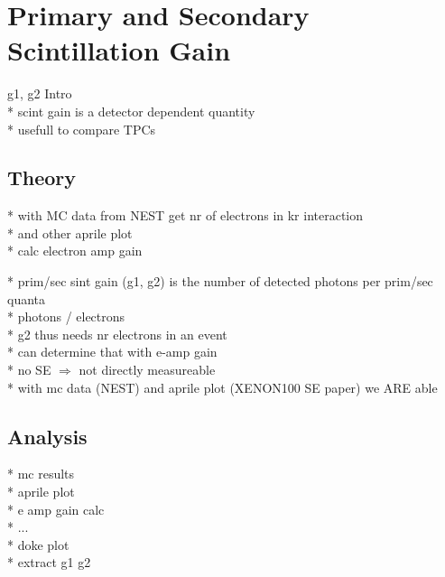 \section{Primary and Secondary Scintillation Gain}
\label{sec:ScintGain}

g1, g2 Intro \\
* scint gain is a detector dependent quantity \\
* usefull to compare TPCs

\subsection{Theory}

* with MC data from NEST get nr of electrons in kr interaction \\
* and other aprile plot \\
* calc electron amp gain

* prim/sec sint gain (g1, g2) is the number of detected photons per prim/sec quanta \\
* photons / electrons \\

* g2 thus needs nr electrons in an event \\
* can determine that with e-amp gain \\
* no SE $\Rightarrow$ not directly measureable \\
* with mc data (NEST) and aprile plot (XENON100 SE paper) we ARE able


\subsection{Analysis}

* mc results \\
* aprile plot \\
* e amp gain calc \\
* ... \\
* doke plot \\
* extract g1 g2




